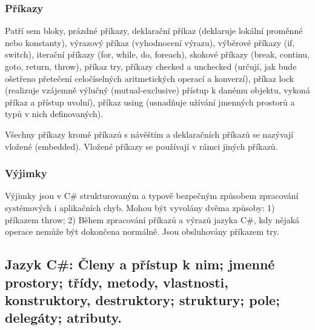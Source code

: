 \subsubsection*{Příkazy}
Patří sem bloky, prázdné příkazy, deklarační příkaz (deklaruje lokální proměnné nebo konstanty), výrazový příkaz (vyhodnocení výrazu), výběrové příkazy (if, switch), iterační příkazy (for, while, do, foreach), skokové příkazy (break, continu, goto, return, throw), příkaz try, příkazy checked a unchecked (určují, jak bude ošetřeno přetečení celočíselných aritmetických operací a konverzí), příkaz lock (realizuje vzájemně výlučný (mutual-exclusive) přístup k danému objektu, vykoná příkaz a přístup uvolní), příkaz using (usnadňuje užívání jmenných prostorů a typů v nich definovaných).

Všechny příkazy kromě příkazů s návěštím a deklaračních příkazů se nazývají vložené (embedded). Vložené příkazy se používají v rámci jiných příkazů.

\subsubsection*{Výjimky}
Výjimky jsou v C\# strukturovaným a typově bezpečným způsobem zpracování systémových i aplikačních chyb. Mohou být vyvolány dvěma způsoby: 1) příkazem throw; 2) Během zpracování příkazů a výrazů jazyka C\#, kdy nějaká operace nemůže být dokončena normálně. Jsou obsluhovány příkazem try.


\subsection{Jazyk C\#: Členy a přístup k nim; jmenné prostory; třídy, metody, vlastnosti, konstruktory, destruktory; struktury; pole; delegáty; atributy.}
